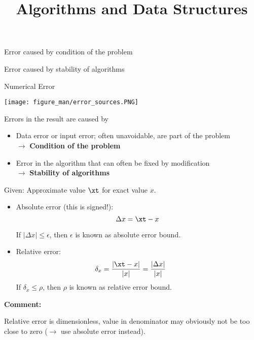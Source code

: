 \documentclass[11pt,compress,t,notes=noshow, xcolor=table]{beamer}
\title{Algorithms and Data Structures}
\begin{document}
{
  \item Error caused by condition of the problem
  \item Error caused by stability of algorithms
}




\begin{vbframe}{Numerical Error}

\begin{center}
\texttt{[image: figure\_man/error\_sources.PNG]}
\end{center}

Errors in the result are caused by
\begin{itemize}
\item Data error or input error; often unavoidable, are part of the problem \\ $\to$ \textbf{Condition of the problem}
\item Error in the algorithm that can often be fixed by modification \\ $\to$ \textbf{Stability of algorithms}
\end{itemize}


\framebreak

Given: Approximate value $\xt$ for exact value $x$.

\begin{itemize}
\item Absolute error (this is signed!):
$$
  \Delta x = \xt - x
$$

If $|\Delta x| \le \epsilon$, then $\epsilon$ is known as absolute error bound.

\item Relative error:
$$
  \delta_x = \frac{|\xt - x|}{|x|} = \frac{|\Delta x|}{|x|}\qquad
$$
If $\delta_x \le \rho$, then $\rho$ is known as relative error bound.
\end{itemize}

\textbf{Comment:}

Relative error is dimensionless, value in denominator
may obviously not be too close to zero ($\to$ use absolute error instead).


\framebreak


\end{vbframe}
\end{document}
